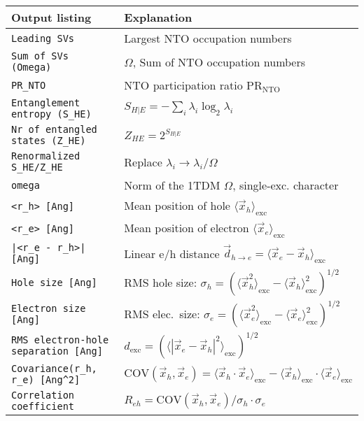 \begin{center}
\begin{tabular}{ll}
\hline
\textbf{Output listing} & \textbf{Explanation} \\
\hline
\verb+Leading SVs+ & Largest NTO occupation numbers \\
\verb+Sum of SVs (Omega)+ & $\Omega$, Sum of NTO occupation numbers \\
\verb+PR_NTO+ & NTO participation ratio $\mathrm{PR}_\mathrm{NTO}$ \cite{Plasser2012}\\
\verb+Entanglement entropy (S_HE)+ & $S_{H|E}=-\sum_i\lambda_i\log_2\lambda_i$ \cite{Plasser2016}\\
\verb+Nr of entangled states (Z_HE)+ & $Z_{HE}=2^{S_{H|E}}$ \\
\verb+Renormalized S_HE/Z_HE+ & Replace $\lambda_i\rightarrow \lambda_i/\Omega$\\
\verb+omega+ & Norm of the 1TDM $\Omega$, single-exc. character \\
\verb+<r_h> [Ang]+ & Mean position of hole $\langle\vec{x}_h\rangle_\mathrm{exc}$ \cite{Plasser2015}\\
\verb+<r_e> [Ang]+ & Mean position of electron $\langle\vec{x}_e\rangle_\mathrm{exc}$ \\
\verb+|<r_e - r_h>| [Ang]+ &
Linear e/h distance $\vec{d}_{h\rightarrow e} = \langle\vec{x}_e - \vec{x}_h\rangle_\mathrm{exc}$ \\
\verb+Hole size [Ang]+ &
RMS hole size: $\sigma_h = (\langle\vec{x}_h^2\rangle_\mathrm{exc} - \langle\vec{x}_h\rangle_\mathrm{exc}^2)^{1/2}$ \\
\verb+Electron size [Ang]+ &
RMS elec.\ size: $\sigma_e = (\langle\vec{x}_e^2\rangle_\mathrm{exc} - \langle\vec{x}_e\rangle_\mathrm{exc}^2)^{1/2}$ \\
\verb+RMS electron-hole separation [Ang]+ &
$d_\mathrm{exc} = (\langle \left|\vec{x}_e - \vec{x}_h\right|^2\rangle_\mathrm{exc})^{1/2}$ \cite{Bappler2014}\\
\verb+Covariance(r_h, r_e) [Ang^2]+ &
$ \mathrm{COV}\left(\vec{x}_h,\vec{x}_e\right) = \langle\vec{x}_h\cdot\vec{x}_e\rangle_\mathrm{exc}
        - \langle\vec{x}_h\rangle_\mathrm{exc}\cdot\langle\vec{x}_e\rangle_\mathrm{exc} $ \\
\verb+Correlation coefficient+ &
$ R_{eh} = \mathrm{COV}\left(\vec{x}_h,\vec{x}_e\right)/\sigma_h\cdot\sigma_e$\\
\hline
\end{tabular}
\end{center}




